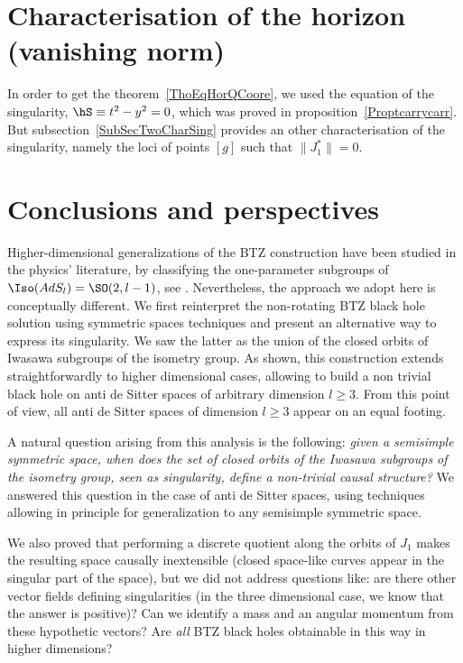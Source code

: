 \section{Characterisation of the horizon (vanishing norm)}
\label{SecVanNormChar}

In order to get the theorem~\ref{ThoEqHorQCoore}, we used the equation of the singularity, $\hS\equiv t^2-y^2=0$, which was proved in proposition~\ref{Proptcarrycarr}. But subsection~\ref{SubSecTwoCharSing} provides an other characterisation of the singularity, namely the loci of points $[g]$ such that $\| J_1^* \|=0$.

\section{Conclusions and perspectives}		\label{SecConcPerspAd}

Higher-dimensional generalizations of the BTZ construction have been studied in the physics' literature, by classifying the one-parameter subgroups of $\Iso(AdS_l)=\SO(2,l-1)$, see \cite{Figueroa,AdSBH,Madden,BanadosIQxXuEh,Aminneborg,HolstPeldan}.  Nevertheless, the approach we adopt here is conceptually different. We first reinterpret the non-rotating BTZ black hole solution using symmetric spaces techniques and present an alternative way to express its singularity.  We saw the latter as the union of the closed orbits of Iwasawa subgroups of the isometry group.  As shown, this construction extends straightforwardly to higher dimensional cases, allowing to build a non trivial black hole on anti de Sitter spaces of arbitrary dimension $l\geq 3$.  From this point of view, all anti de Sitter spaces of dimension $l\geq 3$ appear on an equal footing.

A natural question arising from this analysis is the following: \emph{given a semisimple symmetric space, when does the set of closed orbits of the Iwasawa subgroups of the isometry group, seen as singularity, define a non-trivial causal structure?} We answered this question in the case of anti de Sitter spaces, using techniques allowing in principle for generalization to any semisimple symmetric space.

We also proved that performing a discrete quotient along the orbits of $J_1$ makes the resulting space causally inextensible (closed space-like curves appear in the singular part of the space), but we did not address  questions like: are there other vector fields defining singularities (in the three dimensional case, we know that the answer is positive)? Can we identify a mass and an angular momentum from these hypothetic vectors? Are \emph{all} BTZ black holes obtainable in this way in higher dimensions?
